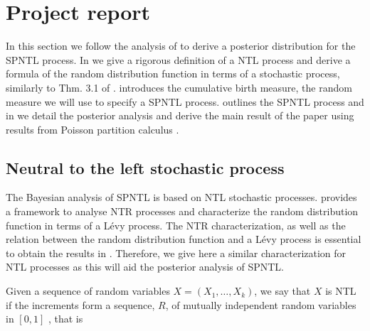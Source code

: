 

\section{Project report}\label{project_report}

In this section we follow the analysis of \cite{james2006poisson} to derive a posterior distribution for the SPNTL process. In  we give a rigorous definition of a NTL process and derive a formula of the random distribution function in terms of a stochastic process, similarly to Thm. 3.1 of \cite{doksum1974tailfree}.  introduces the cumulative birth measure, the random measure we will use to specify a SPNTL process.  outlines the SPNTL process and in  we detail the posterior analysis and derive the main result of the paper using results from Poisson partition calculus \cite{james2005poisson,james2006poisson}.

\subsection{Neutral to the left stochastic process}\label{NTL_definition}
The Bayesian analysis of SPNTL is based on NTL stochastic processes. \cite{doksum1974tailfree} provides a framework to analyse NTR processes and characterize the random distribution function in terms of a L{\'e}vy process. The NTR characterization, as well as the relation between the random distribution function and a L{\'e}vy process is essential to obtain the results in \cite{james2006poisson}. Therefore, we give here a similar characterization for NTL processes as this will aid the posterior analysis of SPNTL.

Given a sequence of random variables $X = (X_1, \ldots, X_k)$, we say that $X$ is NTL if the increments form a sequence, $R$, of mutually independent random variables in $[0, 1]$ \cite{bloem2018sampling}, that is

